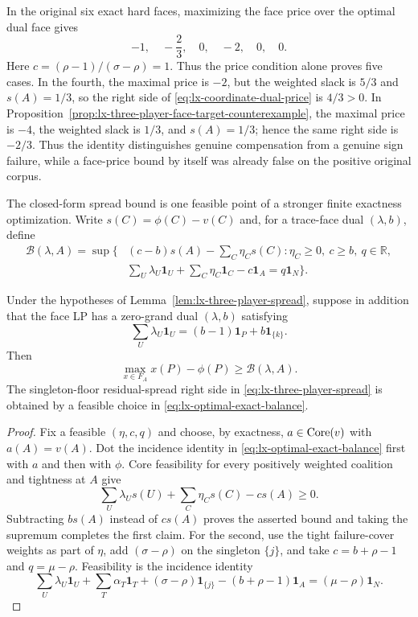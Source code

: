 In the original six exact hard faces, maximizing the face price over the optimal dual
face gives
\[
 -1,\quad-\frac23,\quad0,\quad-2,\quad0,\quad0.
\]
Here $c=(\rho-1)/(\sigma-\rho)=1$.  Thus the price condition alone proves five
cases.  In the fourth, the maximal price is $-2$, but the weighted slack is
$5/3$ and $s(A)=1/3$, so the right side of
\eqref{eq:lx-coordinate-dual-price} is $4/3>0$.  In
Proposition~\ref{prop:lx-three-player-face-target-counterexample}, the maximal
price is $-4$, the weighted slack is $1/3$, and $s(A)=1/3$; hence the same
right side is $-2/3$.  Thus the identity distinguishes genuine compensation
from a genuine sign failure, while a face-price bound by itself was already
false on the positive original corpus.

The closed-form spread bound is one feasible point of a stronger finite
exactness optimization.  Write $s(C)=\phi(C)-v(C)$ and, for a trace-face dual
$(\lambda,b)$, define
\[
 \begin{split}
 \mathcal B(\lambda,A)=\sup\{&(c-b)s(A)-\sum_C\eta_Cs(C):
       \eta_C\geq0,\ c\geq b,\ q\in\mathbb R,\\
   &\sum_U\lambda_U\mathbf1_U+
       \sum_C\eta_C\mathbf1_C-c\mathbf1_A=q\mathbf1_N\}.
 \end{split}
 \tag{OB}\label{eq:lx-optimal-exact-balance}
\]

\begin{proposition}
\label{prop:lx-optimal-exact-balance}
Under the hypotheses of Lemma~\ref{lem:lx-three-player-spread}, suppose in
addition that the face LP has a zero-grand dual $(\lambda,b)$ satisfying
\[
 \sum_U\lambda_U\mathbf1_U
 =(b-1)\mathbf1_P+b\mathbf1_{\{k\}}.
\]
Then
\[
 \max_{x\in F_A}x(P)-\phi(P)\geq\mathcal B(\lambda,A).
\]
The singleton-floor residual-spread right side in
\eqref{eq:lx-three-player-spread} is obtained by a feasible choice in
\eqref{eq:lx-optimal-exact-balance}.
\end{proposition}

\begin{proof}
Fix a feasible $(\eta,c,q)$ and choose, by exactness,
$a\in\operatorname{Core}(v)$ with $a(A)=v(A)$.  Dot the incidence identity in
\eqref{eq:lx-optimal-exact-balance} first with $a$ and then with $\phi$.
Core feasibility for every positively weighted coalition and tightness at
$A$ give
\[
 \sum_U\lambda_Us(U)+\sum_C\eta_Cs(C)-cs(A)\geq0.
\]
Subtracting $bs(A)$ instead of $cs(A)$ proves the asserted bound and taking
the supremum completes the first claim.  For the second, use the tight
failure-cover weights as part of $\eta$, add
$(\sigma-\rho)$ on the singleton $\{j\}$, and take
$c=b+\rho-1$ and $q=\mu-\rho$.  Feasibility is the incidence identity
\[
 \sum_U\lambda_U\mathbf1_U+
 \sum_T\alpha_T\mathbf1_T+(\sigma-\rho)\mathbf1_{\{j\}}
 -(b+\rho-1)\mathbf1_A=(\mu-\rho)\mathbf1_N.
\]
\end{proof}

